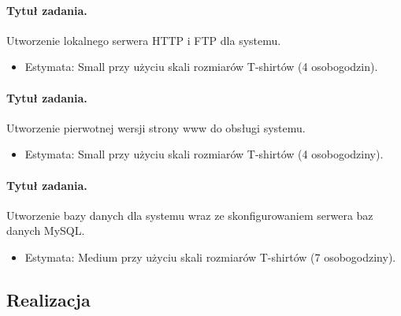 \documentclass[a4paper]{article}
\begin{document}
\paragraph{Tytuł zadania.} Utworzenie lokalnego serwera HTTP i FTP dla systemu.
\begin{itemize}
\item Estymata: Small przy użyciu skali rozmiarów T-shirtów (4 osobogodzin).
\end{itemize}

\paragraph{Tytuł zadania.} Utworzenie pierwotnej wersji strony www do obsługi systemu.
\begin{itemize}
\item Estymata: Small przy użyciu skali rozmiarów T-shirtów (4 osobogodziny).
\end{itemize}

\paragraph{Tytuł zadania.} Utworzenie bazy danych dla systemu wraz ze skonfigurowaniem serwera baz danych MySQL.
\begin{itemize}
\item Estymata: Medium przy użyciu skali rozmiarów T-shirtów (7 osobogodziny).
\end{itemize}

\subsection{Realizacja}
\end{document}
